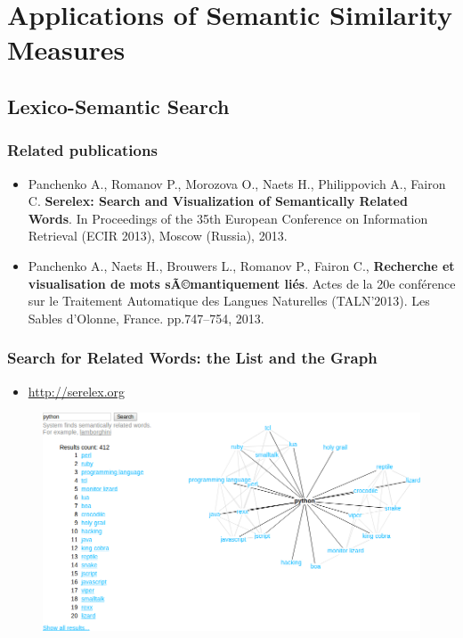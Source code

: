

\section[Applications]{Applications of Semantic Similarity Measures}
\subsection{Lexico-Semantic Search}


\begin{frame}
\frametitle{Related publications}
\begin{itemize}
\item Panchenko A., Romanov P., Morozova O., Naets H., Philippovich A., Fairon
C. \textbf{Serelex: Search and Visualization of Semantically Related Words}.
In Proceedings of the 35th European Conference on Information Retrieval (ECIR 2013), Moscow (Russia), 2013.

\item Panchenko A., Naets H., Brouwers L., Romanov P., Fairon C., \textbf{Recherche et visualisation de mots sÃ©mantiquement li\'{e}s}. Actes de la 20e conf\'{e}rence sur le Traitement Automatique des Langues Naturelles (TALN'2013). Les Sables d'Olonne, France. pp.747--754, 2013.

\end{itemize}
\end{frame}




\begin{frame}
\frametitle{Search for Related Words: the List and the Graph}

\begin{itemize}
\item \url{http://serelex.org}
\end{itemize}


\begin{figure}	
	\centering
	\includegraphics[width=1.0\textwidth]{figures/python}
\end{figure}

\end{frame}




